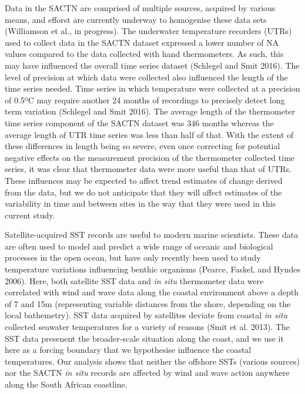 \documentclass[12pt,a4paper,]{article}
\begin{document}
Data in the SACTN are comprised of multiple sources, acquired by various
means, and efforst are currently underway to homogenise these data sets
(Williamson et al., in progress). The underwater temperature recorders
(UTRs) used to collect data in the SACTN dataset expressed a lower
number of NA values compared to the data collected with hand
thermometers. As such, this may have influenced the overall time series
dataset (Schlegel and Smit 2016). The level of precision at which data
were collected also influenced the length of the time series needed.
Time series in which temperature were collected at a precision of 0.5ºC
may require another 24 months of recordings to precisely detect long
term variation (Schlegel and Smit 2016). The average length of the
thermometer time series component of the SACTN dataset was 346 months
whereas the average length of UTR time series was less than half of
that. With the extent of these differences in length being so severe,
even once correcting for potential negative effects on the measurement
precision of the thermometer collected time series, it was clear that
thermometer data were more useful than that of UTRs. These influences
may be expected to affect trend estimates of change derived from the
data, but we do not anticipate that they will affect estimates of the
variability in time and between sites in the way that they were used in
this current study.

Satellite-acquired SST records are useful to modern marine scientists.
These data are often used to model and predict a wide range of oceanic
and biological processes in the open ocean, but have only recently been
used to study temperature variations influencing benthic organisms
(Pearce, Faskel, and Hyndes 2006). Here, both satellite SST data and
\emph{in situ} thermometer data were correlated with wind and wave data
along the coastal environment above a depth of 7 and 15m (representing
variable distances from the shore, depending on the local bathemetry).
SST data acquired by satellites deviate from coastal \emph{in situ}
collected seawater temperatures for a variety of reasons (Smit et al.
2013). The SST data presenent the broader-scale situation along the
coast, and we use it here as a forcing boundary that we hypothesise
influence the coastal temperatures. Our analysis shows that neither the
offshore SSTs (various sources) nor the SACTN \emph{in situ} records are
affected by wind and wave action anywhere along the South African
coastline.
\end{document}
